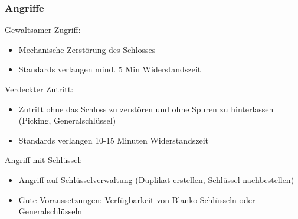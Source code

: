 \documentclass{article} %
\begin{document}
\subsubsection{Angriffe}
Gewaltsamer Zugriff:
\begin{itemize}
	\item Mechanische Zerstörung des Schlosses
    \item Standards verlangen mind. 5 Min Widerstandszeit
\end{itemize}
Verdeckter Zutritt:
\begin{itemize}
	\item Zutritt ohne das Schloss zu zerstören und ohne Spuren zu hinterlassen (Picking, Generalschlüssel)
    \item Standards verlangen 10-15 Minuten Widerstandszeit
\end{itemize}
Angriff mit Schlüssel:
\begin{itemize}
	\item Angriff auf Schlüsselverwaltung (Duplikat erstellen, Schlüssel nachbestellen)
    \item Gute Voraussetzungen: Verfügbarkeit von Blanko-Schlüsseln oder Generalschlüsseln
\end{itemize}
\end{document}
